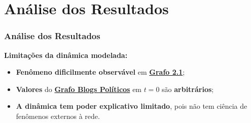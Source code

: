 
\section{Análise dos Resultados}

\begin{frame}
  \frametitle{Análise dos Resultados}

  \textbf{Limitações da dinâmica modelada:}

  \begin{alertblock}{}
    \vspace{5mm}

    \begin{itemize}
      \item \textbf{\alert{Fenômeno dificilmente observável}} em
        \hyperlink{page.21}{\textbf{Grafo 2.1}};
      \vspace{5mm}

      \item \textbf{\alert{Valores}} do \hyperlink{page.21}{\textbf{Grafo Blogs Políticos}}
        em $t = 0$ são \textbf{\alert{arbitrários}};
      \vspace{5mm}

      \item \textbf{\alert{A dinâmica tem poder explicativo limitado}}, pois não
        tem ciência de fenômenos externos à rede.
    \end{itemize}
    \vspace{5mm}

  \end{alertblock}
\end{frame}
